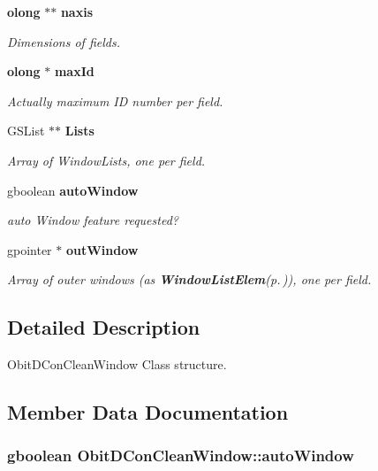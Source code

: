 \begin{CompactItemize}
{\bf olong} $\ast$$\ast$ {\bf naxis}
\begin{CompactList}\small\item\em Dimensions of fields. \item\end{CompactList}\item 
{\bf olong} $\ast$ {\bf max\-Id}
\begin{CompactList}\small\item\em Actually maximum ID number per field. \item\end{CompactList}\item 
GSList $\ast$$\ast$ {\bf Lists}
\begin{CompactList}\small\item\em Array of Window\-Lists, one per field. \item\end{CompactList}\item 
gboolean {\bf auto\-Window}
\begin{CompactList}\small\item\em auto Window feature requested? \item\end{CompactList}\item 
gpointer $\ast$ {\bf out\-Window}
\begin{CompactList}\small\item\em Array of outer windows (as {\bf Window\-List\-Elem}{\rm (p.\,\pageref{structWindowListElem})}), one per field. \item\end{CompactList}\end{CompactItemize}


\subsection{Detailed Description}
Obit\-DCon\-Clean\-Window Class structure. 



\subsection{Member Data Documentation}
\subsubsection{\setlength{\rightskip}{0pt plus 5cm}gboolean {\bf Obit\-DCon\-Clean\-Window::auto\-Window}}\label{structObitDConCleanWindow_o9}


